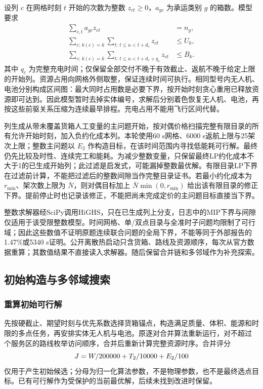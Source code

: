 设列 $c$ 在网格时刻 $t$ 开始的次数为整数 $z_{ct}\ge0$，$a_{gc}$ 为承运类别 $g$ 的箱数。模型要求
\begin{align}
\sum_{c,t}a_{gc}z_{ct}&=n_g,\\
\sum_{c:\,k(c)=k}\sum_{t:\,t\le u<t+d_c}z_{ct}&\le U_k,\\
\sum_{c:\,k(c)=k}\sum_{t:\,t\le u<t+d_c+q_c}z_{ct}&\le B_k.
\end{align}
其中 $q_c$ 为完整充电时间；仅保留全部交付不晚于有效截止、返航不晚于给定上限的开始列。资源占用向网格外侧取整，保证连续时间可执行。相同型号内无人机、电池分别构成区间图：最大同时占用数是必要下界，按开始时刻贪心重用已释放资源即可达到。因此模型暂时去掉实体编号，求解后分别着色恢复无人机、电池，再按这些前驱关系压缩为连续最早排程。充电占用不能用飞行区间代替。

列生成从带未覆盖货箱人工变量的主问题开始，按对偶价格扫描完整有限目录的所有允许开始时刻，加入负约化成本列。本轮使用60 s网格、6000 s返航上限与25架次上限；整数主问题以 $E_2$ 作构造目标，在该时间范围内寻找低能耗可行解。最终仍先比较及时性、连续完工和能耗。为减少整数变量，只保留最终LP约化成本不大于1的已生成开始列；此过滤是启发式，可能漏掉整数最优解。有限目录LP下界在过滤前计算，不能把过滤后的整数间隙当作完整目录证书。若最小约化成本为 $r_{\min}$、架次数上限为 $\bar N$，则对偶目标加上 $\bar N\min(0,r_{\min})$ 给出该有限目录的修正下界。提前停止时也记录该修正，不能把尚未完成定价的主问题目标直接当下界。

整数求解器经SciPy调用HiGHS\cite{scipymilp}，只在已生成列上分支，日志中的MIP下界与间隙仅适用于该受限整数模型。时间网格、单/双点目录与全准时子问题均限制了可行域；因此这些数值不证明原题连续联合问题的全局下界，不能等同于外部报告的1.47\%或5340 s证明。公开离散热启动只含货箱、路线及资源顺序，每次从官方数据重算；其数值结果不直接读入求解器。随后保留合并链和多邻域作为补充探索。

\subsection{初始构造与多邻域搜索}
\subsubsection{重算初始可行解}
先按硬截止、期望时刻与优先系数选择货箱锚点，构造满足质量、体积、能源和时限的多点任务，再安排实体无人机与电池。原逐对合并算法重新运行，对不超过 \MaxRouteServices{} 个服务区的路线枚举访问顺序，合并后重新计算完整资源时序。合并评分
\begin{equation}
J=W/200000+T_2/10000+E_2/100\label{eq:merge-score}
\end{equation}
仅用于产生初始候选；分母为归一化算法参数，不是物理参数，也不是最终选点目标。已有可行解作为受保护的当前最优解，后续未找到改进时保留。

